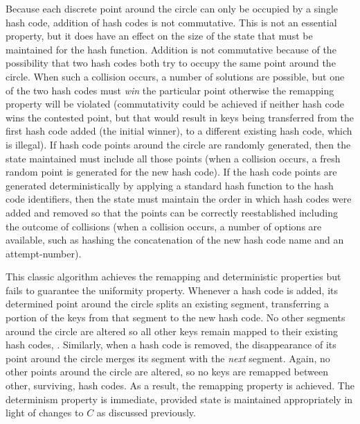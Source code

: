 \documentclass[runningheads,a4paper]{llncs}
\begin{document}
Because each discrete point around the circle can only be occupied by
a single hash code, addition of hash codes is not commutative. This is
not an essential property, but it does have an effect on the size of
the state that must be maintained for the hash function. Addition is
not commutative because of the possibility that two hash codes both
try to occupy the same point around the circle. When such a collision
occurs, a number of solutions are possible, but one of the two hash
codes must {\em win} the particular point otherwise the remapping
property will be violated (commutativity could be achieved if neither
hash code wins the contested point, but that would result in keys
being transferred from the first hash code added (the initial winner),
to a different existing hash code, which is illegal). If hash code
points around the circle are randomly generated, then the state
maintained must include all those points (when a collision occurs, a
fresh random point is generated for the new hash code). If the hash
code points are generated deterministically by applying a standard
hash function to the hash code identifiers, then the state must
maintain the order in which hash codes were added and removed so that
the points can be correctly reestablished including the outcome of
collisions (when a collision occurs, a number of options are
available, such as hashing the concatenation of the new hash code name
and an attempt-number).

This classic algorithm achieves the remapping and deterministic
properties but fails to guarantee the uniformity property. Whenever a
hash code is added, its determined point around the circle splits an
existing segment, transferring a portion of the keys from that segment
to the new hash code. No other segments around the circle are altered
so all other keys remain mapped to their existing hash codes,
. Similarly, when a hash code is removed,
the disappearance of its point around the circle merges its segment
with the {\em next} segment. Again, no other points around the circle
are altered, so no keys are remapped between other, surviving, hash
codes. As a result, the remapping property is achieved. The
determinism property is immediate, provided state is maintained
appropriately in light of changes to $C$ as discussed previously.
\end{document}
